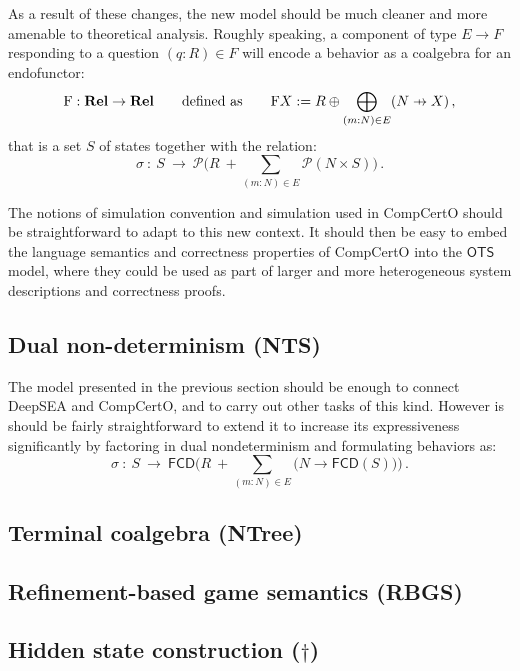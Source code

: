 \documentclass{report}
\newcommand\pfun{\mathrel{\ooalign{\hfil$\mapstochar\mkern5mu$\hfil\cr$\to$\cr}}}
\begin{document}
As a result of these changes,
the new model should be much cleaner and
more amenable to theoretical analysis.
Roughly speaking,
a component of type $E \rightarrow F$
responding to a question $(q \mathbin: R) \in F$
will encode a behavior
as a coalgebra for an endofunctor:
\[
  \mathrm{F} : \mathbf{Rel} \rightarrow \mathbf{Rel}
  \qquad \text{defined as} \qquad
  \mathrm{F} X := R \oplus \bigoplus_{(m \mathbin: N) \in E} (N \pfun X)
  \,,
\]
that is a set $S$ of states together with the relation:
\[
  \sigma \: : \: S \: \rightarrow \: \mathcal{P}
    \Big( R \: + \sum_{(m \mathbin: N) \in E} \mathcal{P}(N \times S) \Big)
  \,.
\]

The notions of simulation convention and simulation
used in CompCertO
should be straightforward to adapt
to this new context.
It should then be easy to embed
the language semantics and correctness properties of CompCertO
into the $\mathsf{OTS}$ model,
where they could be used as part of
larger and more heterogeneous
system descriptions and correctness proofs.


\subsection{Dual non-determinism (NTS)} %

The model presented in the previous section
should be enough to connect DeepSEA and CompCertO,
and to carry out other tasks of this kind.
However is should be fairly straightforward to extend it
to increase its expressiveness significantly
by factoring in dual nondeterminism
and formulating behaviors as:
\[
  \sigma \: : \: S \: \rightarrow \: \mathsf{FCD}
    \Big( R \: + \sum_{(m \mathbin: N) \in E}
        \big( N \rightarrow \mathsf{FCD}(S) \big) \Big)
  \,.
\]


\subsection{Terminal coalgebra (NTree)}

\subsection{Refinement-based game semantics (RBGS)}

\subsection{Hidden state construction ($\dagger$)}
\end{document}
